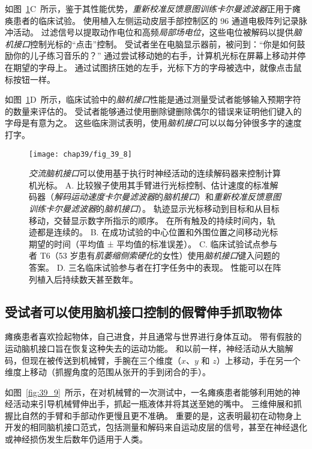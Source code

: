 如图~\ref{fig:39_8}C~所示，鉴于其性能优势，\textit{重新校准反馈意图训练卡尔曼滤波器}正用于瘫痪患者的临床试验。
使用植入左侧运动皮层手部控制区的 96 通道电极阵列记录脉冲活动。
过滤信号以提取动作电位和高频\textit{局部场电位}，这些电位被解码以提供\textit{脑机接口}控制光标的“点击”控制。
受试者坐在电脑显示器前，被问到：“你是如何鼓励你的儿子练习音乐的？” 
通过尝试移动她的右手，计算机光标在屏幕上移动并停在期望的字母上。
通过试图挤压她的左手，光标下方的字母被选中，就像点击鼠标按钮一样。


如图~\ref{fig:39_8}D~所示，临床试验中的\textit{脑机接口}性能是通过测量受试者能够输入预期字符的数量来评估的。
受试者能够通过使用删除键删除偶尔的错误来证明他们键入的字母是有意为之。
这些临床测试表明，使用\textit{脑机接口}可以以每分钟很多字的速度打字。


\begin{figure}[htbp]
	\centering
	\texttt{[image: chap39/fig\_39\_8]}
	\caption{\textit{交流脑机接口}可以使用基于执行时神经活动的连续解码器来控制计算机光标。
		A. 比较猴子使用其手臂进行光标控制、估计速度的标准解码器（\textit{解码运动速度卡尔曼滤波器}的\textit{脑机接口}）和\textit{重新校准反馈意图训练卡尔曼滤波器}的\textit{脑机接口}）。
		轨迹显示光标移动到目标和从目标移动，交替显示数字所指示的顺序。
		在所有触及的持续时间内，轨迹都是连续的\cite{gilja2012high}。
		B. 在成功试验的中心位置和外围位置之间移动光标期望的时间（平均值 ± 平均值的标准误差）\cite{gilja2012high}。
		C. 临床试验试点参与者 T6（53 岁患有\textit{肌萎缩侧索硬化}的女性）使用\textit{脑机接口}键入问题的答案\cite{pandarinath2017high}。
		D. 三名临床试验参与者在打字任务中的表现。
		性能可以在阵列植入后持续数天甚至数年\cite{pandarinath2017high}。}
	\label{fig:39_8}
\end{figure}



\subsection{受试者可以使用脑机接口控制的假臂伸手抓取物体}

瘫痪患者喜欢捡起物体，自己进食，并且通常与世界进行身体互动。
带有假肢的运动脑机接口旨在恢复这种失去的运动功能。
和以前一样，神经活动从大脑解码，但现在被传送到机械臂，手腕在三个维度（$ x $、$ y $ 和 $ z $）上移动，手在另一个维度上移动（抓握角度的范围从张开的手到闭合的手）。


如图~\ref{fig:39_9}~所示，在对机械臂的一次测试中，一名瘫痪患者能够利用她的神经活动来引导机械臂伸出手，抓起一瓶液体并将其送至她的嘴中。
三维伸展和抓握比自然的手臂和手部动作更慢且更不准确。
重要的是，这表明最初在动物身上开发的相同脑机接口范式，包括测量和解码来自运动皮层的信号，甚至在神经退化或神经损伤发生后数年仍适用于人类。


